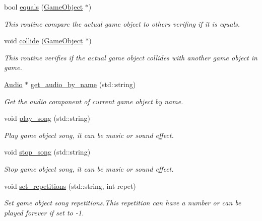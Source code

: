 \begin{DoxyCompactItemize}
bool \hyperlink{classengine_1_1_game_object_a7bceaa3f9faed76a25dc11c9fb3a9b16}{equals} (\hyperlink{classengine_1_1_game_object}{Game\+Object} $\ast$)
\begin{DoxyCompactList}\small\item\em This routine compare the actual game object to others verifing if it is equals. \end{DoxyCompactList}\item 
void \hyperlink{classengine_1_1_game_object_a869a76802055d23b7604e48b584177f1}{collide} (\hyperlink{classengine_1_1_game_object}{Game\+Object} $\ast$)
\begin{DoxyCompactList}\small\item\em This routine verifies if the actual game object collides with another game object in game. \end{DoxyCompactList}\item 
\hyperlink{classengine_1_1_audio}{Audio} $\ast$ \hyperlink{classengine_1_1_game_object_a8f0543e762ba71c9e094e791ce4bc065}{get\+\_\+audio\+\_\+by\+\_\+name} (std\+::string)
\begin{DoxyCompactList}\small\item\em Get the audio component of current game object by name. \end{DoxyCompactList}\item 
void \hyperlink{classengine_1_1_game_object_a1f41bb02b31ce7f828bc8ef4963d3aed}{play\+\_\+song} (std\+::string)
\begin{DoxyCompactList}\small\item\em Play game object song, it can be music or sound effect. \end{DoxyCompactList}\item 
void \hyperlink{classengine_1_1_game_object_a162ddcb22b60dd7d6c3c6108751fd835}{stop\+\_\+song} (std\+::string)
\begin{DoxyCompactList}\small\item\em Stop game object song, it can be music or sound effect. \end{DoxyCompactList}\item 
void \hyperlink{classengine_1_1_game_object_ab00ac1e7a2d01677797680a1d81681f0}{set\+\_\+repetitions} (std\+::string, int repet)
\begin{DoxyCompactList}\small\item\em Set game object song repetitions.\+This repetition can have a number or can be played forever if set to -\/1. \end{DoxyCompactList}\item 

\end{DoxyCompactItemize}
